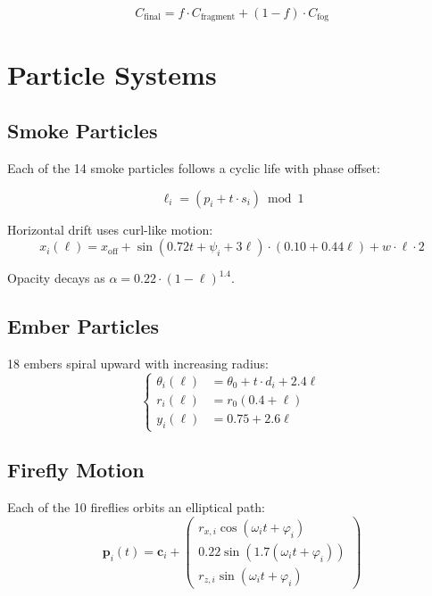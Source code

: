 \documentclass[12pt,a4paper]{report}
\begin{document}
\begin{equation}
C_{\text{final}} = f \cdot C_{\text{fragment}} + (1 - f) \cdot C_{\text{fog}}
\label{eq:fogblend}
\end{equation}

\section{Particle Systems}

\subsection{Smoke Particles}

Each of the 14 smoke particles follows a cyclic life with phase offset:

\begin{equation}
\ell_i = \left(p_i + t \cdot s_i\right) \bmod 1
\label{eq:smokelife}
\end{equation}

Horizontal drift uses curl-like motion:
\begin{equation}
x_i(\ell) = x_{\text{off}} + \sin(0.72t + \psi_i + 3\ell) \cdot (0.10 + 0.44\ell) + w \cdot \ell \cdot 2
\label{eq:smokex}
\end{equation}

Opacity decays as $\alpha = 0.22 \cdot (1 - \ell)^{1.4}$.

\subsection{Ember Particles}

18 embers spiral upward with increasing radius:
\begin{equation}
\begin{cases}
  \theta_i(\ell) &= \theta_0 + t \cdot d_i + 2.4\ell \\
  r_i(\ell) &= r_0 (0.4 + \ell) \\
  y_i(\ell) &= 0.75 + 2.6\ell
\end{cases}
\label{eq:ember}
\end{equation}

\subsection{Firefly Motion}

Each of the 10 fireflies orbits an elliptical path:
\begin{equation}
\mathbf{p}_i(t) = \mathbf{c}_i + \begin{pmatrix} r_{x,i} \cos(\omega_i t + \varphi_i) \\ 0.22 \sin(1.7(\omega_i t + \varphi_i)) \\ r_{z,i} \sin(\omega_i t + \varphi_i) \end{pmatrix}
\label{eq:firefly}
\end{equation}
\end{document}
